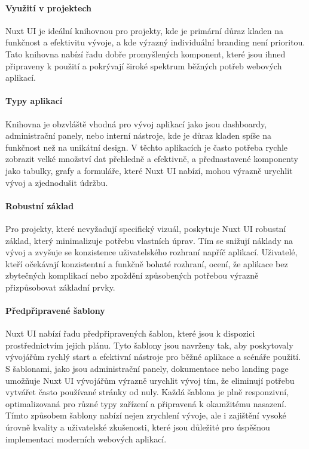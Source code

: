 \paragraph{Využití v projektech}
Nuxt UI je ideální knihovnou pro projekty, kde je primární důraz kladen na funkčnost a efektivitu vývoje, a kde výrazný individuální branding není prioritou. Tato knihovna nabízí řadu dobře promyšlených komponent, které jsou ihned připraveny k použití a pokrývají široké spektrum běžných potřeb webových aplikací.

\paragraph{Typy aplikací}
Knihovna je obzvláště vhodná pro vývoj aplikací jako jsou dashboardy, administrační panely, nebo interní nástroje, kde je důraz kladen spíše na funkčnost než na unikátní design. V těchto aplikacích je často potřeba rychle zobrazit velké množství dat přehledně a efektivně, a přednastavené komponenty jako tabulky, grafy a formuláře, které Nuxt UI nabízí, mohou výrazně urychlit vývoj a zjednodušit údržbu.

\paragraph{Robustní základ}
Pro projekty, které nevyžadují specifický vizuál, poskytuje Nuxt UI robustní základ, který minimalizuje potřebu vlastních úprav. Tím se snižují náklady na vývoj a zvyšuje se konzistence uživatelského rozhraní napříč aplikací. Uživatelé, kteří očekávají konzistentní a funkčně bohaté rozhraní, ocení, že aplikace  bez zbytečných komplikací nebo zpoždění způsobených potřebou výrazně přizpůsobovat základní prvky.

\paragraph{Předpřipravené šablony}
Nuxt UI nabízí řadu předpřipravených šablon, které jsou k dispozici prostřednictvím jejich  plánu. Tyto šablony jsou navrženy tak, aby poskytovaly vývojářům rychlý start a efektivní nástroje pro běžné aplikace a scénáře použití. S šablonami, jako jsou administrační panely, dokumentace nebo landing page umožňuje Nuxt UI vývojářům výrazně urychlit vývoj tím, že eliminují potřebu vytvářet často používané stránky od nuly. Každá šablona je plně responzivní, optimalizovaná pro různé typy zařízení a připravená k okamžitému nasazení. Tímto způsobem šablony nabízí nejen zrychlení vývoje, ale i zajištění vysoké úrovně kvality a uživatelské zkušenosti, které jsou důležité pro úspěšnou implementaci moderních webových aplikací. \cite{NuxtUITemplates}

